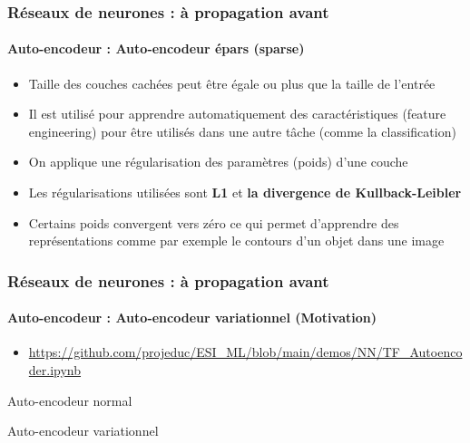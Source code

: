 \documentclass[xcolor=table]{beamer}
\begin{document}
\begin{frame}
\frametitle{Réseaux de neurones : à propagation avant}
\framesubtitle{Auto-encodeur : Auto-encodeur épars (sparse)}

\begin{itemize}
	\item Taille des couches cachées peut être égale ou plus que la taille de l'entrée 
	\item Il est utilisé pour apprendre automatiquement des caractéristiques (feature engineering) pour être utilisés dans une autre tâche (comme la classification)
	\item On applique une régularisation des paramètres (poids) d'une couche 
	\item Les régularisations utilisées sont \textbf{L1} et \textbf{la divergence de Kullback-Leibler}
	\item Certains poids convergent vers zéro ce qui permet d'apprendre des représentations comme par exemple le contours d'un objet dans une image
\end{itemize}

\end{frame}

\begin{frame}
	\frametitle{Réseaux de neurones : à propagation avant}
	\framesubtitle{Auto-encodeur : Auto-encodeur variationnel (Motivation)}
	
	\begin{itemize}
		\item {\scriptsize\url{https://github.com/projeduc/ESI_ML/blob/main/demos/NN/TF_Autoencoder.ipynb}}
	\end{itemize}
	
	\begin{minipage}{0.47\textwidth} 
		\begin{center}
			Auto-encodeur normal
		\end{center}\vskip-6pt
	\end{minipage}
	\begin{minipage}{0.47\textwidth}
		\begin{center}
			Auto-encodeur variationnel
		\end{center}\vskip-6pt
	\end{minipage}
	
\end{frame}
\end{document}
